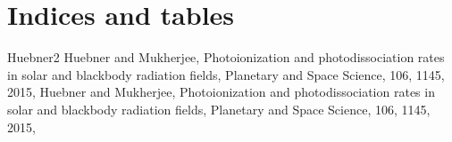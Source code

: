 \documentclass[letterpaper,10pt,english]{sphinxmanual}
\begin{document}
\section{Indices and tables}
\label{\detokenize{index:indices-and-tables}}
\sphinxAtStartPar
{}

\begin{sphinxthebibliography}{Huebner2}
\sphinxAtStartPar
Huebner and Mukherjee, Photoionization and photodissociation
rates in solar and blackbody radiation fields, Planetary and Space Science, 106,
11\sphinxhyphen{}45, 2015, 
\sphinxAtStartPar
Huebner and Mukherjee, Photoionization and photodissociation
rates in solar and blackbody radiation fields, Planetary and Space Science, 106,
11\sphinxhyphen{}45, 2015, 
\end{sphinxthebibliography}
\end{document}
